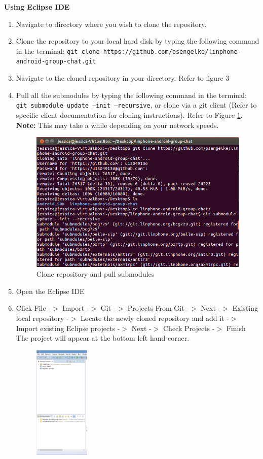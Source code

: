 \documentclass[11pt]{article}
\begin{document}
\textbf{Using Eclipse IDE}
\begin{enumerate}
\item Navigate to directory where you wish to clone the repository. 
\item Clone the repository to your local hard disk by typing the following command in the terminal: \newline
\texttt{git clone https://github.com/psengelke/linphone-android-group-chat.git}
\item Navigate to the cloned repository in your directory. Refer to figure 3
\item Pull all the submodules by typing the following command in the terminal: \texttt{git submodule update --init --recursive}, or clone via a git client (Refer to specific client documentation for cloning instructions). Refer to Figure \ref{cmd_clone}. \\
\textbf{Note:} This may take a while depending on your network speeds.
\begin{figure}[H]
\centering
\includegraphics[width=5in]{./images/clone.png}
\caption{Clone repository and pull submodules}
\label{cmd_clone}
\end{figure}
\item Open the Eclipse IDE
\item Click File -$>$ Import -$>$ Git -$>$ Projects From Git -$>$ Next -$>$ Existing local repository -$>$ Locate the newly cloned repository and add it -$>$ Import existing Eclipse projects -$>$ Next -$>$ Check Projects -$>$ Finish
\subitem The project will appear at the bottom left hand corner.
\begin{figure}[H]
\centering
\includegraphics[width=100px]{./images/git.png}

\end{figure}
\end{enumerate}
\end{document}
